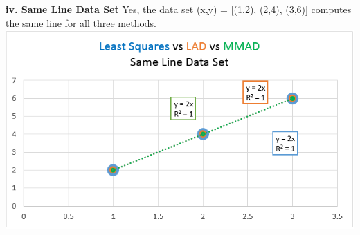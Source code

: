 \documentclass[paper=a4, fontsize=11pt]{scrartcl} %
\numberwithin{equation}{section} %
\numberwithin{figure}{section} %
\numberwithin{table}{section} %
\begin{document}
    \textbf{iv. Same Line Data Set}\newline
    Yes, the data set (x,y) = [(1,2), (2,4), (3,6)] computes the same line for all three methods.\newline
    \includegraphics[width=\textwidth]{p3pbiv}
\end{document}
